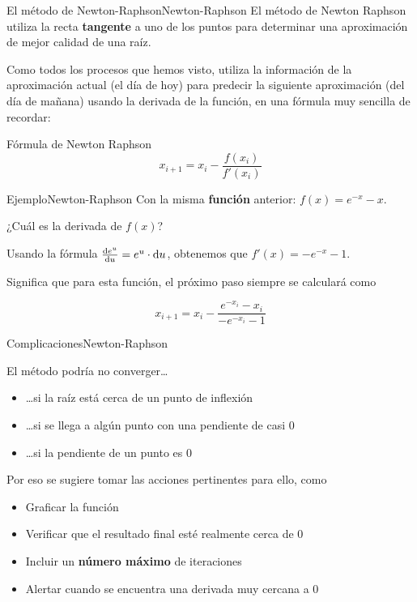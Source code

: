 \documentclass[spanish, c]{beamer}
\begin{document}
\begin{frame}{El método de Newton-Raphson}{Newton-Raphson}
    El método de \alert{Newton Raphson} utiliza la recta \textbf{tangente} a uno de los puntos para determinar una aproximación de mejor calidad de una raíz. \pause

    \bigskip

    Como todos los procesos que hemos visto, utiliza la información de la aproximación actual (el día de hoy) para predecir la siguiente aproximación (del día de mañana) usando la derivada de la función, en una fórmula muy sencilla de recordar: \pause

    \begin{block}{Fórmula de Newton Raphson}
        $$x_{i+1} = x_i - \frac{f(x_i)}{f'(x_i)}$$
    \end{block}

\end{frame}

\begin{frame}{Ejemplo}{Newton-Raphson}
    Con la misma \textbf{función} anterior: $f(x) = e^{-x} - x$. \pause

    \bigskip

    ¿Cuál es la derivada de $f(x)$? \pause

    Usando la fórmula $\dv{e^u}{u} = e^u \cdot \dd{u}$, obtenemos que $f'(x) = -e^{-x} - 1$. \pause

    \bigskip

    Significa que para esta función, el próximo paso siempre se calculará como

    $$x_{i+1} = x_i - \frac{e^{-x_i} - x_i}{-e^{-x_i} - 1}$$

\end{frame}

\begin{frame}{Complicaciones}{Newton-Raphson}

    El método podría no converger\dots \pause

    \begin{itemize}
        \item \dots si la raíz está cerca de un punto de inflexión \pause
        \item \dots si se llega a algún punto con una pendiente de casi 0 \pause
        \item \dots si la pendiente de un punto es 0
    \end{itemize} \pause

    Por eso se sugiere tomar las acciones pertinentes para ello, como

    \begin{itemize}[<+->]
        \item Graficar la función
        \item Verificar que el resultado final esté realmente cerca de 0
        \item Incluir un \textbf{número máximo} de iteraciones
        \item Alertar cuando se encuentra una derivada muy cercana a 0
    \end{itemize}
\end{frame}
\end{document}
